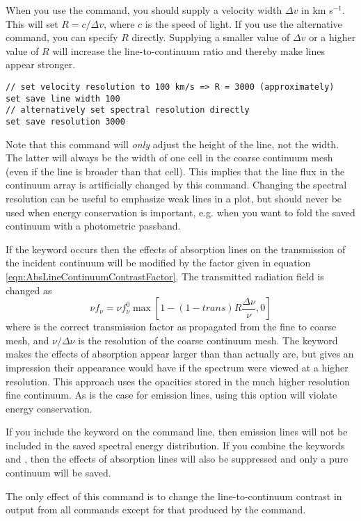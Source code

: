 \begin{description}
When you use the  command, you should supply a
velocity width $\Delta v$ in km s$^{-1}$. This will set $R = c/\Delta v$,
where $c$ is the speed of light. If you use the alternative  command, you can specify $R$ directly. Supplying a smaller
value of $\Delta v$ or a higher value of $R$ will increase the line-to-continuum
ratio and thereby make lines appear stronger.
\begin{verbatim}
// set velocity resolution to 100 km/s => R = 3000 (approximately)
set save line width 100
// alternatively set spectral resolution directly
set save resolution 3000
\end{verbatim}

Note that this command will {\em only} adjust the height of the line, not the
width. The latter will always be the width of one cell in the coarse continuum mesh
(even if the line is broader than that cell). This implies that
the line flux in the continuum array is artificially changed by this command.
Changing the spectral resolution can be useful to emphasize weak lines in a plot,
but should never be used when energy conservation is important, e.g. when
you want to fold the saved continuum with a photometric passband.

If the keyword  occurs then the effects
of absorption lines on the transmission of the incident continuum
will be modified by the factor given in
equation \ref{eqn:AbsLineContinuumContrastFactor}.
The transmitted radiation field is changed as
\begin{equation}
\nu f_\nu   = \nu f_\nu ^0 \max \left[ {1 - \left( {1 - trans} \right)R\frac{\Delta\nu}{\nu}} , 0 \right]
\label{eqn:AbsLineContinuumContrastFactor}
\end{equation}
where  is the correct transmission factor as propagated
from the fine to coarse mesh, and $\nu/\Delta\nu$ is the resolution of the coarse continuum mesh.
The keyword  makes the effects of absorption appear larger than than
actually are, but gives an impression their appearance would have if
the spectrum were viewed at a higher resolution. This approach
uses the opacities stored in the much higher resolution fine continuum.
As is the case for emission lines, using this option will violate energy conservation.

If you include the keyword  on the command line, then
emission lines will not be included in the saved spectral energy distribution.
If you combine the keywords  and , then
the effects of absorption lines will also be suppressed and only a pure continuum
will be saved.

The only effect of this command is to change the line-to-continuum
contrast in output from all  commands
except for that produced by the
 command.
\end{description}

